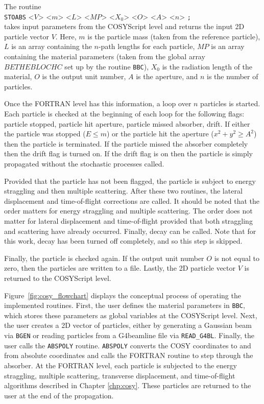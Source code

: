 The routine\\
\texttt{STOABS} <$V$> <$m$> <$L$> <$MP$> <$X_0$> <$O$> <$A$> <$n$> \texttt{;} \\
takes input parameters from the COSYScript level and returns the input 2D particle vector $V$. Here, $m$ is the particle mass (taken from the reference particle), $L$ is an array containing the $n$-path lengths for each particle, $MP$ is an array containing the material parameters (taken from the global array $BETHEBLOCHC$ set up by the routine \texttt{BBC}), $X_0$ is the radiation length of the material, $O$ is the output unit number, $A$ is the aperture, and $n$ is the number of particles.

Once the FORTRAN level has this information, a loop over $n$ particles is started. Each particle is checked at the beginning of each loop for the following flags: particle stopped, particle hit aperture, particle missed absorber, drift. If either the particle was stopped ($E\leq m$) or the particle hit the aperture ($x^2+y^2\geq A^2$) then the particle is terminated. If the particle missed the absorber completely then the drift flag is turned on. If the drift flag is on then the particle is simply propagated without the stochastic processes called.

Provided that the particle has not been flagged, the particle is subject to energy straggling and then multiple scattering. After these two routines, the lateral displacement and time-of-flight corrections are called. It should be noted that the order matters for energy straggling and multiple scattering. The order does not matter for lateral displacement and time-of-flight provided that both straggling and scattering have already occurred. Finally, decay can be called. Note that for this work, decay has been turned off completely, and so this step is skipped.

Finally, the particle is checked again. If the output unit number $O$ is not equal to zero, then the particles are written to a file. Lastly, the 2D particle vector $V$ is returned to the COSYScript level.


Figure~\ref{fig:cosy_flowchart} displays the conceptual process of operating the implemented routines. First, the user defines the material parameters in \texttt{BBC}, which stores these parameters as global variables at the COSYScript level. Next, the user creates a 2D vector of particles, either by generating a Gaussian beam via \texttt{BGEN} or reading particles from a G4beamline file via \verb|READ_G4BL|. Finally, the user calls the \texttt{ABSPOLY} routine. \texttt{ABSPOLY} converts the COSY coordinates to and from absolute coordinates and calls the FORTRAN routine to step through the absorber. At the FORTRAN level, each particle is subjected to the energy straggling, multiple scattering, transverse displacement, and time-of-flight algorithms described in Chapter \ref{chp:cosy}. These particles are returned to the user at the end of the propagation.